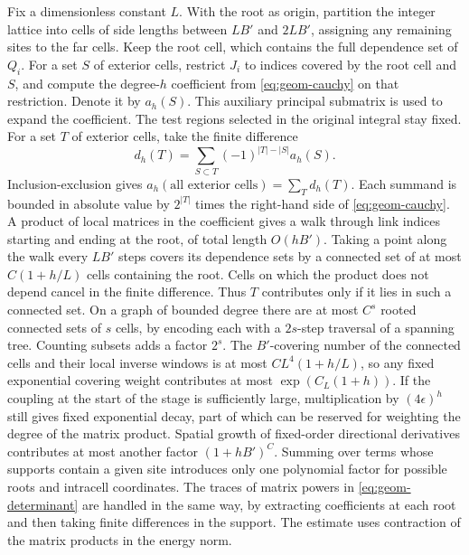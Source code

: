 \documentclass[11pt,a4paper]{article}
\numberwithin{equation}{section}
\begin{document}
Fix a dimensionless constant \(L\). With the root as origin, partition the integer lattice into cells of side lengths between \(LB'\) and \(2LB'\), assigning any remaining sites to the far cells. Keep the root cell, which contains the full dependence set of \(Q_i\). For a set \(S\) of exterior cells, restrict \(J_i\) to indices covered by the root cell and \(S\), and compute the degree-\(h\) coefficient from \eqref{eq:geom-cauchy} on that restriction. Denote it by \(a_h(S)\). This auxiliary principal submatrix is used to expand the coefficient. The test regions selected in the original integral stay fixed. For a set \(T\) of exterior cells, take the finite difference
\[
         d_h(T)=\sum_{S\subset T}(-1)^{|T|-|S|}a_h(S).
\]
Inclusion-exclusion gives \(a_h(\text{all exterior cells})=\sum_Td_h(T)\). Each summand is bounded in absolute value by \(2^{|T|}\) times the right-hand side of \eqref{eq:geom-cauchy}. A product of local matrices in the coefficient gives a walk through link indices starting and ending at the root, of total length \(O(hB')\). Taking a point along the walk every \(LB'\) steps covers its dependence sets by a connected set of at most \(C(1+h/L)\) cells containing the root. Cells on which the product does not depend cancel in the finite difference. Thus \(T\) contributes only if it lies in such a connected set. On a graph of bounded degree there are at most \(C^s\) rooted connected sets of \(s\) cells, by encoding each with a \(2s\)-step traversal of a spanning tree. Counting subsets adds a factor \(2^s\). The \(B'\)-covering number of the connected cells and their local inverse windows is at most \(C L^4(1+h/L)\), so any fixed exponential covering weight contributes at most \(\exp(C_L(1+h))\). If the coupling at the start of the stage is sufficiently large, multiplication by \((4\epsilon)^h\) still gives fixed exponential decay, part of which can be reserved for weighting the degree of the matrix product. Spatial growth of fixed-order directional derivatives contributes at most another factor \((1+hB')^C\). Summing over terms whose supports contain a given site introduces only one polynomial factor for possible roots and intracell coordinates. The traces of matrix powers in \eqref{eq:geom-determinant} are handled in the same way, by extracting coefficients at each root and then taking finite differences in the support. The estimate uses contraction of the matrix products in the energy norm.
\end{document}
